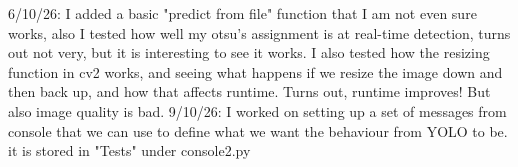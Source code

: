 \documentclass[12pt]{article}
\begin{document}
6/10/26: I added a basic "predict from file" function that I am not even sure works, also I tested how well my otsu's assignment is at real-time detection, turns out not very, but it is interesting to see it works. I also tested how the resizing function in cv2 works, and seeing what happens if we resize the image down and then back up, and how that affects runtime. Turns out, runtime improves! But also image quality is bad.
9/10/26: I worked on setting up a set of messages from console that we can use to define what we want the behaviour from YOLO to be. it is stored in "Tests" under console2.py
\end{document}
